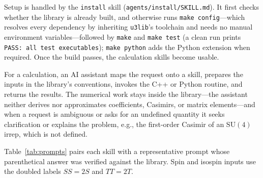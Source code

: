 \documentclass[aps,onecolumn,10pt,superscriptaddress,floatfix,nofootinbib]{revtex4}
\begin{document}
Setup is handled by the \verb|install| skill
(\verb|agents/install/SKILL.md|). It first checks whether the library is already
built, and otherwise runs \verb|make config|---which resolves every dependency
by inheriting \texttt{u3lib}'s toolchain and needs no manual environment
variables---followed by \verb|make| and \verb|make test| (a clean run prints
\verb|PASS: all test executables|); \verb|make python| adds the Python extension
when required. Once the build passes, the calculation skills become usable.

For a calculation, an AI assistant maps the request onto a skill, prepares the
inputs in the library's conventions, invokes the C++ or Python routine,
and returns the results. 
The numerical work stays inside
the library---the assistant neither derives nor approximates coefficients,
Casimirs, or matrix elements---and when a request is ambiguous or asks for an
undefined quantity it seeks clarification or explains the problem, e.g., the
first-order Casimir of an $\mathrm{SU(4)}$ irrep, which is not defined.

Table~\ref{tab:prompts} pairs each skill with a representative prompt whose
parenthetical answer was verified against the library. 
Spin and isospin inputs use the doubled labels $SS=2S$ and $TT=2T$.
\end{document}
